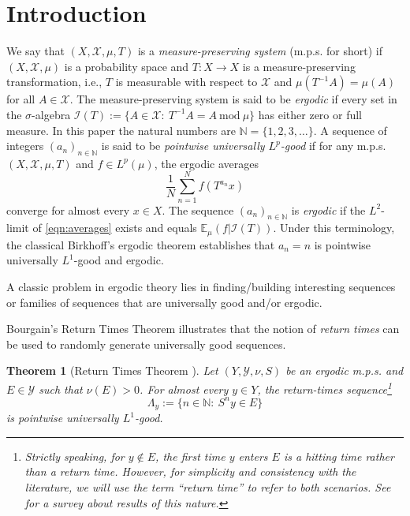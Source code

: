 \documentclass[11pt]{amsart}
\numberwithin{equation}{section}
\newtheorem{theorem}[lemma]{Theorem}
\theoremstyle{definition}
\newcommand{\Mod}[1]{\ \mathrm{mod}\ #1}
\theoremstyle{plain}
\newcommand{\N}{{\mathbb N}}
\begin{document}
\maketitle
\small
\normalsize
\section{Introduction}

We say that $(X,\mathcal{X},\mu,T)$ is a \emph{measure-preserving system} (m.p.s. for short) if $(X,\mathcal{X},\mu)$ is a probability space and $T\colon X\to X$ is a measure-preserving transformation, i.e., $T$ is measurable with respect to $\mathcal{X}$  and $\mu(T^{-1}A)=\mu(A)$ for all $A\in \mathcal{X}$. 
The measure-preserving system is said to be \emph{ergodic} if every set in the $\sigma$-algebra $\mathcal{I}(T):=\{A\in \mathcal{X}:\ T^{-1}A=A \Mod{\mu}\}$ has either zero or full measure. 
In this paper the natural numbers are $\N = \{1, 2, 3, \ldots\}$. A sequence of integers $(a_n)_{n\in \N}$ is said to be \emph{pointwise universally $L^p$-good} if for any m.p.s. $(X,\mathcal{X},\mu,T)$ and $f\in L^p(\mu)$,  the ergodic averages 
\begin{equation}
    \dfrac{1}{N}\sum_{n=1}^Nf\left(T^{a_n}x\right)\label{eqn:averages}
\end{equation}
converge for almost every $x\in X$. 
The sequence $(a_n)_{n\in \N}$ is {\em ergodic} if the $L^2$-limit of \eqref{eqn:averages} exists and equals  $\mathbb{E}_\mu(f|\mathcal{I}(T))$.
Under this terminology, the classical Birkhoff's ergodic theorem establishes that $a_n=n$ is pointwise universally $L^1$-good and ergodic. 

A classic problem in ergodic theory lies in finding/building interesting sequences or families of sequences that are universally good and/or ergodic.  

Bourgain's Return Times Theorem \cite{ReturnTimes} illustrates that the notion of \emph{return times} can be used to randomly generate universally good sequences.

\begin{theorem}[Return Times Theorem \cite{ReturnTimes}] \label{Return times ergodic theorem} Let $(Y,\mathcal{Y},\nu,S)$ be an ergodic m.p.s. and $E\in \mathcal{Y}$ such that $\nu(E)>0$. For almost every $y\in Y$, the return-times sequence\footnote{ Strictly speaking, for $y\notin E$, the first time $y$ enters $E$ is a {\em hitting time} rather than a return time. However, for simplicity and consistency with the literature, we will use the term ``return time'' to refer to both scenarios. See \cite{Survey_Assani_Presser} for a survey about results of this nature. } $$\Lambda_y:=\{n\in \N:\ S^ny\in E\}$$ is pointwise universally $L^1$-good.
\end{theorem}
\end{document}
